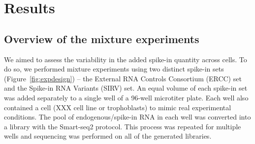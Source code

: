 \documentclass{article}
\begin{document}
% 

\section{Results}

\newcommand\variance{\mbox{var}}

\subsection{Overview of the mixture experiments}
We aimed to assess the variability in the added spike-in quantity across cells.
To do so, we performed mixture experiments using two distinct spike-in sets (Figure~\ref{fig:expdesign}) -- the External RNA Controls Consortium (ERCC) set and the Spike-in RNA Variants (SIRV) set.
An equal volume of each spike-in set was added separately to a single well of a 96-well microtiter plate.
Each well also contained a cell (XXX cell line or trophoblasts) to mimic real experimental conditions.
The pool of endogenous/spike-in RNA in each well was converted into a library with the Smart-seq2 protocol.
This process was repeated for multiple wells and sequencing was performed on all of the generated libraries.
\end{document}
